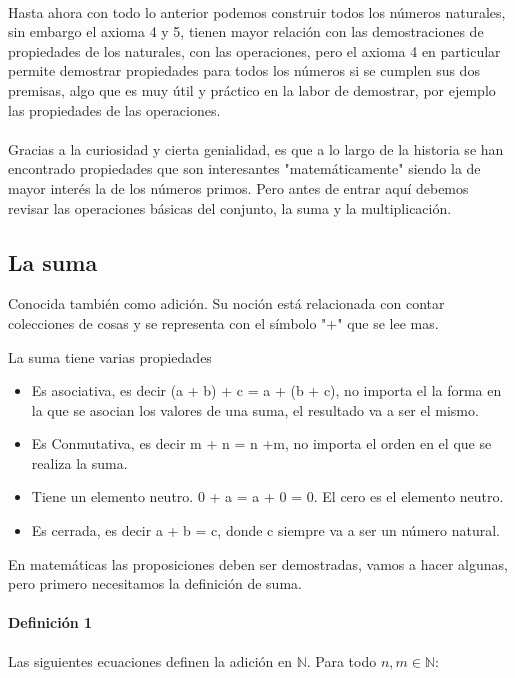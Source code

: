 \documentclass{article}
\begin{document}
\paragraph{} Hasta ahora con todo lo anterior podemos construir todos los números naturales, sin embargo el axioma 4 y 5, tienen mayor relación con las demostraciones de propiedades de los naturales, con las operaciones, pero el axioma 4 en particular permite demostrar propiedades para todos los números si se cumplen sus dos premisas, algo que es muy útil y práctico en la labor de demostrar, por ejemplo las propiedades de las operaciones.

\paragraph{} Gracias a la curiosidad y cierta genialidad, es que a lo largo de la historia se han encontrado propiedades que son interesantes "matemáticamente" siendo la de mayor interés la de los números primos. Pero antes de entrar aquí debemos revisar las operaciones básicas del conjunto, la suma y la multiplicación.

\subsection{La suma}

Conocida también como adición. Su noción está relacionada con contar colecciones de cosas y se representa con el símbolo "+" que se lee mas.

La suma tiene varias propiedades

\begin{itemize}
    \item Es asociativa, es decir (a + b) + c = a + (b + c), no importa el la forma en la que se asocian los valores de una suma, el resultado va a ser el mismo.
    \item Es Conmutativa, es decir m + n = n +m, no importa el orden en el que se realiza la suma.
    \item Tiene un elemento neutro.  0 + a = a + 0 = 0. El cero es el elemento neutro.
    \item Es cerrada, es decir a + b = c, donde c siempre va a ser un número natural.
\end{itemize}

En matemáticas las proposiciones deben ser demostradas, vamos a hacer algunas, pero primero necesitamos la definición de suma.

\paragraph{Definición 1}\cite{tnumprincip_2004}\label{def:sum} Las siguientes ecuaciones definen la adición en $\mathbb{N}$. Para todo $n,m \in \mathbb{N}$:
\end{document}
